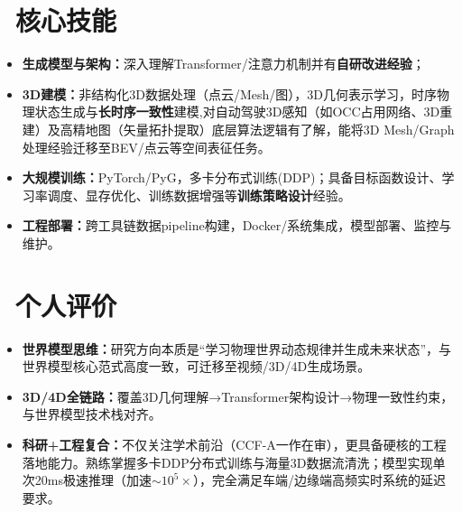 \documentclass[11pt]{article}
\begin{document}
  
\section{\makebox[\widthof{\faCogs}][c]{\color{CVBlue}\faCogs}\ 核心技能}
    
\begin{itemize}
    \item \textbf{生成模型与架构：}深入理解Transformer/注意力机制并有\textbf{自研改进经验}；
    \item \textbf{3D建模：}非结构化3D数据处理（点云/Mesh/图），3D几何表示学习，时序物理状态生成与\textbf{长时序一致性}建模,对自动驾驶3D感知（如OCC占用网络、3D重建）及高精地图（矢量拓扑提取）底层算法逻辑有了解，能将3D Mesh/Graph处理经验迁移至BEV/点云等空间表征任务。
    \item \textbf{大规模训练：}PyTorch/PyG，多卡分布式训练(DDP)；具备目标函数设计、学习率调度、显存优化、训练数据增强等\textbf{训练策略设计}经验。
    \item \textbf{工程部署：}跨工具链数据pipeline构建，Docker/系统集成，模型部署、监控与维护。
\end{itemize}

\section{\makebox[\widthof{\faUser}][c]{\color{CVBlue}\faUser}\ 个人评价}

\begin{itemize}
    \item \textbf{世界模型思维：}研究方向本质是``学习物理世界动态规律并生成未来状态''，与世界模型核心范式高度一致，可迁移至视频/3D/4D生成场景。
    \item \textbf{3D/4D全链路：}覆盖3D几何理解→Transformer架构设计→物理一致性约束，与世界模型技术栈对齐。
    \item \textbf{科研+工程复合：}不仅关注学术前沿（CCF-A一作在审），更具备硬核的工程落地能力。熟练掌握多卡DDP分布式训练与海量3D数据流清洗；模型实现单次20ms极速推理（加速$\sim 10^5 \times$），完全满足车端/边缘端高频实时系统的延迟要求。
\end{itemize}
\end{document}
